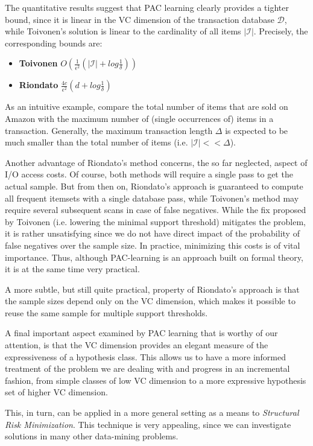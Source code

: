 \documentclass[11pt]{sigplanconf}
\renewcommand\it{\textit}
\renewcommand\bf{\textbf}
\newcommand\I{\mathcal{I}}
\newcommand\D{\mathcal{D}}
\begin{document}
The quantitative results suggest that PAC learning clearly provides a tighter bound, since it is linear in the VC dimension of the transaction database $\D$, while Toivonen's solution is linear to the cardinality of all items $|\I|$. Precisely, the corresponding bounds are:
\begin{itemize}
\item \bf{Toivonen} $O(\frac{1}{\epsilon^2}(|\I| + log\frac{1}{\delta}))$
\item \bf{Riondato} $\frac{4c}{\epsilon^2}(d + log\frac{1}{\delta})$
\end{itemize}
As an intuitive example, compare the total number of items that are sold on Amazon with the maximum number of (single occurrences of) items in a transaction. Generally, the maximum transaction length $\Delta$ is expected to be much smaller than the total number of items (i.e. $|\I| << \Delta$).

Another advantage of Riondato's method concerns, the so far neglected, aspect of I/O access costs. Of course, both methods will require a single pass to get the actual sample. But from then on, Riondato's approach is guaranteed to compute all frequent itemsets with a single database pass, while Toivonen's method may require several subsequent scans in case of false negatives. While the fix proposed by Toivonen (i.e. lowering the minimal support threshold) mitigates the problem, it is rather unsatisfying since we do not have direct impact of the probability of false negatives over the sample size. In practice, minimizing this costs is of vital importance. Thus, although PAC-learning is an approach built on formal theory, it is at the same time very practical.

A more subtle, but still quite practical, property of Riondato's approach is that the sample sizes depend only on the VC dimension, which makes it possible to reuse the same sample for multiple support thresholds.

A final important aspect examined by PAC learning that is worthy of our attention, is that the VC dimension provides an elegant measure of the expressiveness of a hypothesis class. This allows us to have a more informed treatment of the problem we are dealing with and progress in an incremental fashion, from simple classes of low VC dimension to a more expressive hypothesis set of higher VC dimension.

This, in turn, can be applied in a more general setting as a means to \it{Structural Risk Minimization}. This technique is very appealing, since we can investigate solutions in many other data-mining problems.
\end{document}
